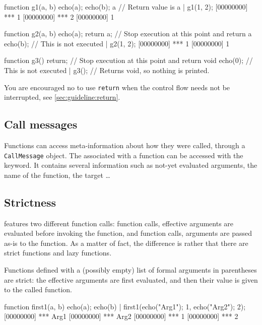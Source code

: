 \begin{urbiscript}
function g1(a, b)
{
  echo(a);
  echo(b);
  a // Return value is a
}|
g1(1, 2);
[00000000] *** 1
[00000000] *** 2
[00000000] 1

function g2(a, b)
{
  echo(a);
  return a; // Stop execution at this point and return a
  echo(b); // This is not executed
}|
g2(1, 2);
[00000000] *** 1
[00000000] 1

function g3()
{
  return; // Stop execution at this point and return void
  echo(0); // This is not executed
}|
g3(); // Returns void, so nothing is printed.
\end{urbiscript}

You are encouraged no to use \lstinline{return} when the control flow needs
not be interrupted, see \autoref{sec:guideline:return}.

\subsection{Call messages}
\label{sec:lang:call}

Functions can access meta-information about how they were called, through a
\lstinline|CallMessage| object. The  associated with a
function can be accessed with the  keyword. It contains
several information such as not-yet evaluated arguments, the name of the
function, the target \ldots

\subsection{Strictness}

\us features two different function calls:
 function calls, effective arguments are
evaluated before invoking the function, and 
function calls, arguments are passed as-is to the function.  As a
matter of fact, the difference is rather that there are strict
functions and lazy functions.

Functions defined with a (possibly empty) list of formal arguments in
parentheses are strict: the effective arguments are first evaluated,
and then their value is given to the called function.

\begin{urbiscript}
function first1(a, b) {
  echo(a); echo(b)
}|
first1({echo("Arg1"); 1},
       {echo("Arg2"); 2});
[00000000] *** Arg1
[00000000] *** Arg2
[00000000] *** 1
[00000000] *** 2
\end{urbiscript}

